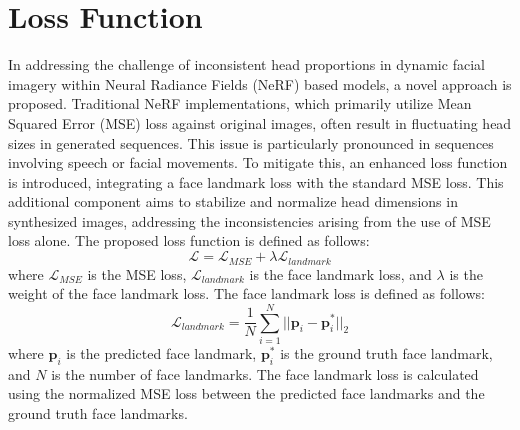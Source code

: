 \section{Loss Function}
In addressing the challenge of inconsistent head proportions in dynamic facial imagery within Neural Radiance Fields (NeRF) based models, a novel approach is proposed. Traditional NeRF implementations, which primarily utilize Mean Squared Error (MSE) loss against original images, often result in fluctuating head sizes in generated sequences. This issue is particularly pronounced in sequences involving speech or facial movements.
To mitigate this, an enhanced loss function is introduced, integrating a face landmark loss with the standard MSE loss. This additional component aims to stabilize and normalize head dimensions in synthesized images, addressing the inconsistencies arising from the use of MSE loss alone.
The proposed loss function is defined as follows:
\begin{equation}
    \mathcal{L} = \mathcal{L}_{MSE} + \lambda \mathcal{L}_{landmark}
\end{equation}
where $\mathcal{L}_{MSE}$ is the MSE loss, $\mathcal{L}_{landmark}$ is the face landmark loss, and $\lambda$ is the weight of the face landmark loss.
The face landmark loss is defined as follows:
\begin{equation}
    \mathcal{L}_{landmark} = \frac{1}{N}\sum_{i=1}^{N}||\mathbf{p}_i - \mathbf{p}_i^*||_2
\end{equation}
where $\mathbf{p}_i$ is the predicted face landmark, $\mathbf{p}_i^*$ is the ground truth face landmark, and $N$ is the number of face landmarks.
The face landmark loss is calculated using the normalized MSE loss between the predicted face landmarks and the ground truth face landmarks.
